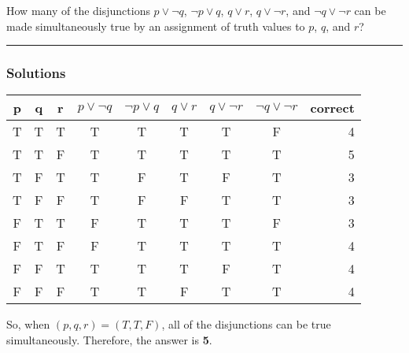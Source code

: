 \newpage
\begin{question}
How many of the disjunctions $p \lor \neg q$, $\neg p \lor q$, $q \lor r$, $q \lor \neg r$, and $\neg q \lor \neg r$ can be made simultaneously true by an assignment of truth values to $p$, $q$, and $r$?
\end{question}

\par\noindent\rule{\textwidth}{0.5pt}

\subsubsection*{Solutions}

\begin{center}
\begin{tabular}[h]{|ccc|ccccc|r|}
    \hline
    p & q & r & $p \lor \neg q$ & $\neg p \lor q$ & $q \lor r$ & $q \lor \neg r$ & $\neg q \lor \neg r$ & correct \\
    \hline
    T & T & T & T & T & T & T & F & 4 \\
    T & T & F & T & T & T & T & T & 5 \\
    T & F & T & T & F & T & F & T & 3 \\
    T & F & F & T & F & F & T & T & 3 \\
    F & T & T & F & T & T & T & F & 3 \\
    F & T & F & F & T & T & T & T & 4 \\
    F & F & T & T & T & T & F & T & 4 \\
    F & F & F & T & T & F & T & T & 4 \\
    \hline
\end{tabular}
\end{center}

\noindent So, when $(p, q, r) = (T, T, F)$, all of the disjunctions can be true simultaneously. Therefore, the answer is \textbf{5}.